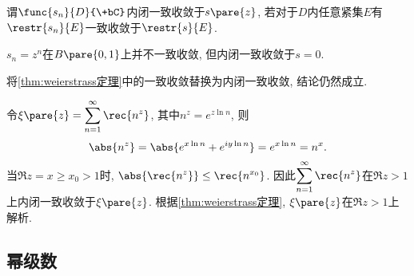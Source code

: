 \documentclass{ctexart}
\begin{document}
\begin{definition}
    谓$\func{s_n}{D}{\+bC}$内闭一致收敛于$s\pare{z}$, 若对于$D$内任意紧集$E$有$\restr{s_n}{E}$一致收敛于$\restr{s}{E}$.
\end{definition}
\begin{ex}
    $s_n = z^n$在$B\pare{0,1}$上并不一致收敛, 但内闭一致收敛于$s=0$.
\end{ex}
\begin{remark}
    将\cref{thm:weierstrass定理}中的一致收敛替换为内闭一致收敛, 结论仍然成立.
\end{remark}
\begin{sample}
    \begin{ex}
        令$\displaystyle \xi\pare{z} = \sum_{n=1}^\infty \rec{n^z}$, 其中$n^z = e^{z\ln n}$, 则
        \[ \abs{n^z} = \abs{e^{x\ln n} + e^{iy\ln n}} = e^{x\ln n} = n^x. \]
        当$\Re z = x \ge x_0 > 1$时, $\displaystyle \abs{\rec{n^z}}\le\rec{n^{x_0}}$. 因此$\displaystyle \sum_{n=1}^\infty \rec{n^z}$在$\Re z>1$上内闭一致收敛于$\xi\pare{z}$. 根据\cref{thm:weierstrass定理}, $\xi\pare{z}$在$\Re z > 1$上解析.
    \end{ex}
\end{sample}


\subsection{幂级数} %
\label{sub:幂级数}
\end{document}
